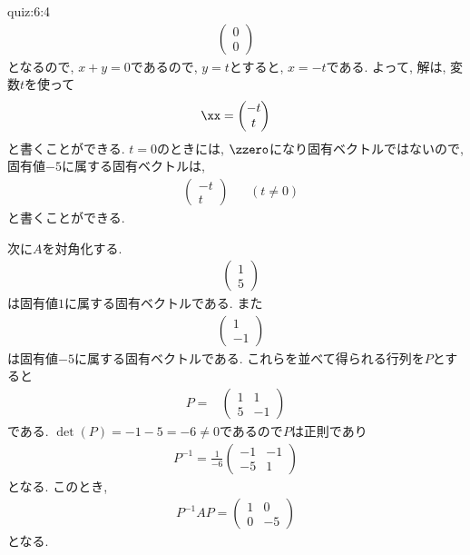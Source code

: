 \begin{answerof}{quiz:6:4}
\begin{align*}
      \begin{pmatrix}0\\0\end{pmatrix}
  \end{align*}
  となるので,
   $x+y=0$であるので,
  $y=t$とすると, $x=-t$である.
  よって, 解は, 変数$t$を使って
  \begin{align*}
    \xx=\begin{pmatrix}-t\\t\end{pmatrix} 
  \end{align*}
  と書くことができる.
  $t=0$のときには, $\zzero$になり固有ベクトルではないので,
  固有値$-5$に属する固有ベクトルは,
  \begin{align*}
    &\begin{pmatrix}-t\\t\end{pmatrix}
       &&(t\neq 0)
  \end{align*}
  と書くことができる.

  
  次に$A$を対角化する.
  \begin{align*}
    &\begin{pmatrix}1\\5\end{pmatrix}
  \end{align*}
  は固有値$1$に属する固有ベクトルである.
  また
  \begin{align*}
    &\begin{pmatrix}1\\-1\end{pmatrix}
  \end{align*}
  は固有値$-5$に属する固有ベクトルである.
  これらを並べて得られる行列を$P$とすると
  \begin{align*}
    P=&\begin{pmatrix}1&1\\5&-1\end{pmatrix}
  \end{align*}
  である.
  $\det(P)=-1-5=-6\neq 0$であるので$P$は正則であり
  \begin{align*}
    P^{-1}=\frac{1}{-6}\begin{pmatrix}-1&-1\\-5&1\end{pmatrix}
  \end{align*}
  となる.
  このとき,
  \begin{align*}
    P^{-1}AP=\begin{pmatrix}1&0\\0&-5\end{pmatrix}
  \end{align*}
  となる.



\end{answerof}
